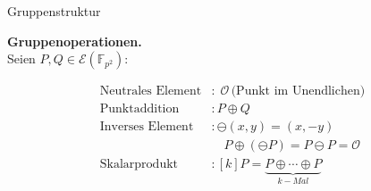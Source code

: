 \begin{frame}{Gruppenstruktur}
    \begin{algorithmblock}
        \textbf{Gruppenoperationen.}\\
        Seien $P,Q\in \mathcal{E}(\mathbb{F}_{p^2})$:
         \end{algorithmblock}
        \begin{align*}
        \text{Neutrales Element}&: \; \mathcal{O}\,\text{(Punkt im Unendlichen)}\\
        \text{Punktaddition}&:P\oplus Q\\
        \text{Inverses Element}&: \ominus(x,y)=(x,-y) \\ &\quad P\oplus(\ominus P)=P\ominus P=\mathcal{O}\\
        \text{Skalarprodukt}&:[k]P=\underbrace{P\oplus\cdots\oplus P}_{k-Mal}
        \end{align*}
        
        
   
    
\end{frame}